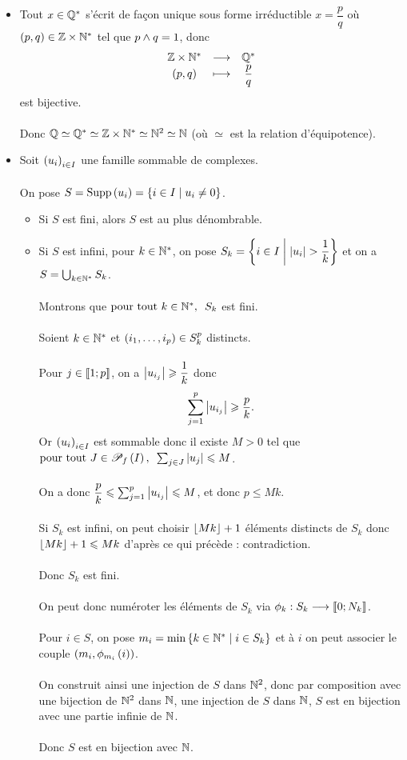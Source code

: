 \begin{dem}
\begin{itemize}
    \item Tout \(x\in\mathbb{Q}^*\) s'écrit de façon unique sous forme irréductible \(x=\dfrac{p}{q}\) où \(\left(p,q\right)\in\mathbb{Z}\times\mathbb{N}^*\) tel que \(p\land q=1\), donc \[\begin{array}[t]{ccc}\mathbb{Z}\times\mathbb{N}^* & \longrightarrow & \mathbb{Q}^* \\ \left(p,q\right) & \longmapsto & \dfrac{p}{q}\end{array}\] est bijective. \\\\ Donc \(\mathbb{Q}\simeq\mathbb{Q}^*\simeq\mathbb{Z}\times\mathbb{N}^*\simeq\mathbb{N}^2\simeq\mathbb{N}\) (où \(\simeq\) est la relation d'équipotence). \\
    \item Soit \(\left(u_i\right)_{i\in I}\) une famille sommable de complexes. \\\\ On pose \(S=\operatorname{Supp}\left(u_i\right)=\left\lbrace i\in I\;\middle|\; u_i\not=0\right\rbrace\). \\ \begin{itemize}
        \item Si \(S\) est fini, alors \(S\) est au plus dénombrable. \\
        \item Si \(S\) est infini, pour \(k\in\mathbb{N}^*\), on pose \(S_k=\left\lbrace i\in I\;\middle|\;\left\lvert u_i\right\rvert>\dfrac{1}{k}\right\rbrace\) et on a \(S=\bigcup_{k\in\mathbb{N}^*}S_k\). \\\\ Montrons que \(\quantifs{\tpt k\in\Ns}S_k\) est fini. \\\\ Soient \(k\in\mathbb{N}^*\) et \(\left(i_1,\dots,i_p\right)\in S_k^p\) distincts. \\\\ Pour \(j\in\left\llbracket1;p\right\rrbracket\), on a \(\left\lvert u_{i_j}\right\rvert\geqslant\dfrac{1}{k}\) donc \[\sum_{j=1}^p\left\lvert u_{i_j}\right\rvert\geqslant\dfrac{p}{k}.\] Or \(\left(u_i\right)_{i\in I}\) est sommable donc il existe \(M>0\) tel que \(\quantifs{\tpt J\in\Pf{I}}\sum_{j\in J}\abs{u_j}\leq M\). \\\\ On a donc \(\dfrac{p}{k}\leqslant\sum_{j=1}^p\left\lvert u_{i_j}\right\rvert\leqslant M\), et donc \(p\leq Mk\). \\\\ Si \(S_k\) est infini, on peut choisir \(\left\lfloor Mk\right\rfloor+1\) éléments distincts de \(S_k\) donc \(\left\lfloor Mk\right\rfloor+1\leqslant Mk\) d'après ce qui précède : contradiction. \\\\ Donc \(S_k\) est fini. \\\\ On peut donc numéroter les éléments de \(S_k\) via \(\phi_k:S_k\longrightarrow\left\llbracket0;N_k\right\rrbracket\). \\\\ Pour \(i\in S\), on pose \(m_i=\min\left\lbrace k\in\mathbb{N}^*\;\middle|\; i\in S_k\right\rbrace\) et à \(i\) on peut associer le couple \(\left(m_i,\phi_{m_i}\left(i\right)\right)\). \\\\ On construit ainsi une injection de \(S\) dans \(\mathbb{N}^2\), donc par composition avec une bijection de \(\mathbb{N}^2\) dans \(\mathbb{N}\), une injection de \(S\) dans \(\mathbb{N}\), \ie \(S\) est en bijection avec une partie infinie de \(\mathbb{N}\). \\\\ Donc \(S\) est en bijection avec \(\mathbb{N}\).

\end{itemize}
\end{itemize}
\end{dem}
